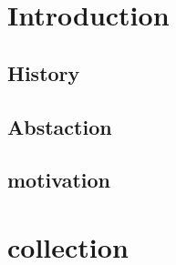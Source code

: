 \documentclass[12pt]{report}
\begin{document}
\begin{titlepage}

\tableofcontents
\end{titlepage}
\chapter{Introduction}
\section{History}
\section{Abstaction}
\section{motivation}
\chapter{collection}
\end{document}
